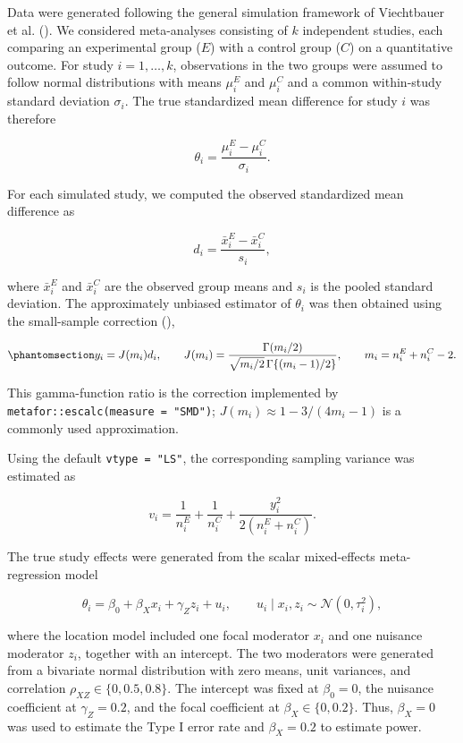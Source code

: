 \documentclass[
  man,
  longtable,
  nolmodern,
  notxfonts,
  notimes,
  colorlinks=true,linkcolor=blue,citecolor=blue,urlcolor=blue]{apa7}
\begin{document}
Data were generated following the general simulation framework of
Viechtbauer et al. (). We
considered meta-analyses consisting of \(k\) independent studies, each
comparing an experimental group (\(E\)) with a control group (\(C\)) on
a quantitative outcome. For study \(i=1,\ldots,k\), observations in the
two groups were assumed to follow normal distributions with means
\(\mu_i^E\) and \(\mu_i^C\) and a common within-study standard deviation
\(\sigma_i\). The true standardized mean difference for study \(i\) was
therefore

\[
\theta_i
=
\frac{\mu_i^E-\mu_i^C}{\sigma_i}.
\]

For each simulated study, we computed the observed standardized mean
difference as

\[
d_i
=
\frac{\bar{x}_i^E-\bar{x}_i^C}{s_i},
\]

where \(\bar{x}_i^E\) and \(\bar{x}_i^C\) are the observed group means
and \(s_i\) is the pooled standard deviation. The approximately unbiased
estimator of \(\theta_i\) was then obtained using the small-sample
correction (),

\begin{equation}\phantomsection\label{eq-g}{
y_i=J(m_i)d_i,
\qquad
J(m_i)
=
\frac{
\Gamma(m_i/2)
}{
\sqrt{m_i/2}\,\Gamma\{(m_i-1)/2\}
},
\qquad
m_i=n_i^E+n_i^C-2.
}\end{equation}

This gamma-function ratio is the correction implemented by
\texttt{metafor::escalc(measure\ =\ "SMD")};
\(J(m_i)\approx 1-3/(4m_i-1)\) is a commonly used approximation.

Using the default \texttt{vtype\ =\ "LS"}, the corresponding sampling
variance was estimated as

\[
v_i = 
\frac{1}{n_i^E}
+
\frac{1}{n_i^C}
+
\frac{y_i^2}
{2\left(n_i^E+n_i^C\right)}.
\]

The true study effects were generated from the scalar mixed-effects
meta-regression model

\[
\theta_i
=
\beta_0+\beta_X x_i+\gamma_Z z_i+u_i,
\qquad
u_i\mid x_i,z_i\sim\mathcal{N}(0,\tau_i^2),
\]

where the location model included one focal moderator \(x_i\) and one
nuisance moderator \(z_i\), together with an intercept. The two
moderators were generated from a bivariate normal distribution with zero
means, unit variances, and correlation \(\rho_{XZ}\in\{0,0.5,0.8\}\).
The intercept was fixed at \(\beta_0=0\), the nuisance coefficient at
\(\gamma_Z=0.2\), and the focal coefficient at \(\beta_X\in\{0,0.2\}\).
Thus, \(\beta_X=0\) was used to estimate the Type I error rate and
\(\beta_X=0.2\) to estimate power.
\end{document}
